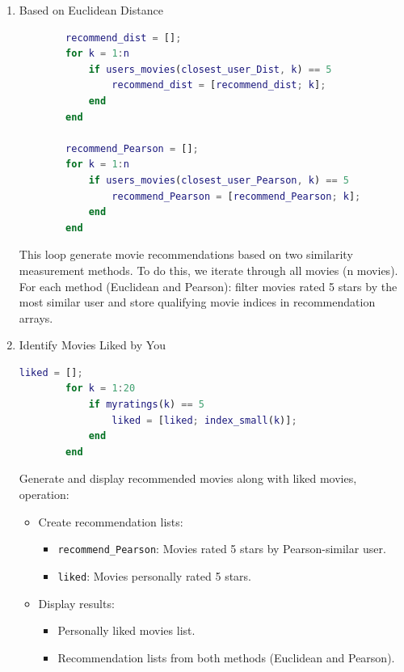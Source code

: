 \begin{enumerate}[label=\alph*.]
	\item Based on Euclidean Distance 
	
	\begin{lstlisting}[style=StyleCode, language=MATLAB]
		% Recommendations based on myratings
		recommend_dist = [];
		for k = 1:n
			if users_movies(closest_user_Dist, k) == 5
				recommend_dist = [recommend_dist; k];
			end
		end
		
		recommend_Pearson = [];
		for k = 1:n
			if users_movies(closest_user_Pearson, k) == 5
				recommend_Pearson = [recommend_Pearson; k];
			end
		end
	\end{lstlisting}
	
	This loop generate movie recommendations based on two similarity measurement methods. To do this, we iterate through all movies (n movies). For each method (Euclidean and Pearson): filter movies rated 5 stars by the most similar user and store qualifying movie indices in recommendation arrays.
	
	\item Identify Movies Liked by You
	
	\begin{lstlisting}[style=StyleCode, language=MATLAB]
		liked = [];
		for k = 1:20
			if myratings(k) == 5
				liked = [liked; index_small(k)];
			end
		end
	\end{lstlisting}
	
%	
%	
	
	Generate and display recommended movies along with liked movies, operation:
	
	\begin{itemize}[label=-]
		\item Create recommendation lists:
			\begin{itemize}[label=+]
				\item \texttt{recommend\_Pearson}: Movies rated 5 stars by Pearson-similar user.
				\item \texttt{liked}: Movies personally rated 5 stars.
			\end{itemize}
		\item Display results:
			\begin{itemize}[label=+]
				\item Personally liked movies list.
				\item Recommendation lists from both methods (Euclidean and Pearson).
			\end{itemize}
	\end{itemize}
\end{enumerate}

